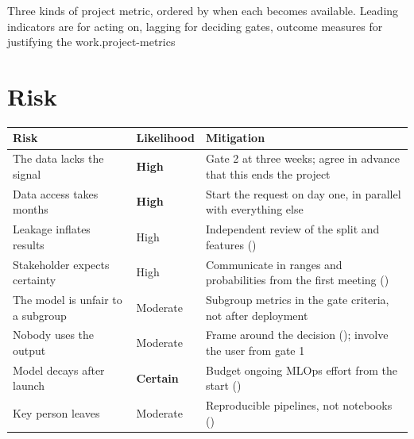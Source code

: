 {}%
{Three kinds of project metric, ordered by when each becomes available. Leading indicators
are for acting on, lagging for deciding gates, outcome measures for justifying the
work.}{project-metrics}

\section{Risk}

\begin{longtable}{@{}L{3.9cm}L{4.1cm}L{6.0cm}@{}}
\toprule
{}
\textbf{Risk} & \textbf{Likelihood} & \textbf{Mitigation} \\
\midrule
\endhead
The data lacks the signal & \textbf{High} & Gate 2 at three weeks; agree in advance that this ends the project \\
Data access takes months & \textbf{High} & Start the request on day one, in parallel with everything else \\
Leakage inflates results & High & Independent review of the split and features () \\
Stakeholder expects certainty & High & Communicate in ranges and probabilities from the first meeting () \\
The model is unfair to a subgroup & Moderate & Subgroup metrics in the gate criteria, not after deployment \\
Nobody uses the output & Moderate & Frame around the decision (); involve the user from gate 1 \\
Model decays after launch & \textbf{Certain} & Budget ongoing MLOps effort from the start () \\
Key person leaves & Moderate & Reproducible pipelines, not notebooks () \\
\bottomrule
\end{longtable}

